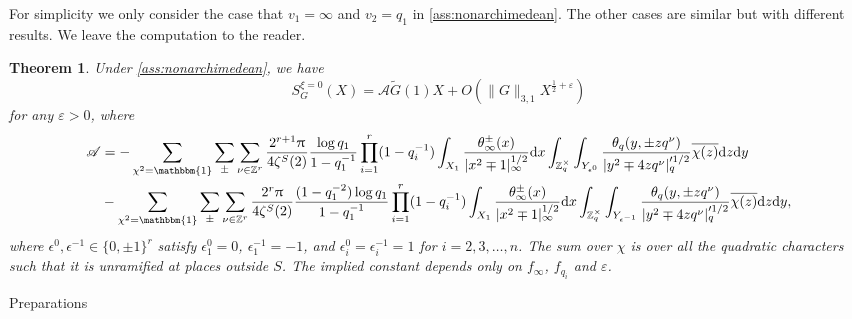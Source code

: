 \documentclass[10pt,oneside,reqno]{amsart}
\makeatletter
\newcommand\rmd{\mathrm{d}}
\newcommand\ZZ{\mathbb{Z}}
\newcommand\ms[1]{\mathscr{#1}}
\newcommand\triv{\mathbbm{1}}
\def\subsection{\@startsection{subsection}{2}%
  \z@{3pt\@plus0pt}{-.5em}%
  {\normalfont\bfseries}}
\theoremstyle{THEOREM}
\newtheorem{theorem}{Theorem}[section]
\theoremstyle{DEFINITION}
\theoremstyle{EXERCISE}
\numberwithin{equation}{section}
\makeatother
\begin{document}
For simplicity we only consider the case that $v_1=\infty$ and $v_2=q_1$ in \autoref{ass:nonarchimedean}. The other cases are similar but with different results. We leave the computation to the reader.
\begin{theorem}\label{thm:contributionxi0}
Under \autoref{ass:nonarchimedean}, we have
\[
S_G^{\xi=0}(X)=\ms{A}\widetilde{G}(1) X+O(\|G\|_{3,1}X^{\frac12+\varepsilon})
\]
for any $\varepsilon>0$,
where
\begin{align*}
\ms{A}&=-\sum_{\chi^2=\triv}\sum_{\pm}\sum_{\nu\in \ZZ^r}\frac{2^{r+1}\uppi}{4\zeta^S(2)}\frac{\log q_1}{1-q_1^{-1}}\prod_{i=1}^{r}(1-q_i^{-1})\int_{X_1}\frac{\theta_\infty^\pm(x)}{|x^2\mp 1|_\infty^{1/2}}\rmd x \int_{\ZZ_{q}^\times}\int_{Y_{\epsilon^0}} \frac{\theta_{q}(y,\pm zq^\nu)}{|y^2\mp 4zq^\nu|_q'^{1/2}}\overline{\chi(z)}\rmd z\rmd y \\
&-\sum_{\chi^2=\triv}\sum_{\pm}\sum_{\nu\in \ZZ^r}\frac{2^{r}\uppi}{4\zeta^S(2)}\frac{(1-q_1^{-2})\log q_1}{1-q_1^{-1}}\prod_{i=1}^{r}(1-q_i^{-1})\int_{X_1}\frac{\theta_\infty^\pm(x)}{|x^2\mp 1|_\infty^{1/2}}\rmd x \int_{\ZZ_{q}^\times}\int_{Y_{\epsilon^{-1}}} \frac{\theta_{q}(y,\pm zq^\nu)}{|y^2\mp 4zq^\nu|_q'^{1/2}}\overline{\chi(z)}\rmd z\rmd y,
\end{align*}
where $\epsilon^0, \epsilon^{-1}\in \{0,\pm 1\}^r$ satisfy $\epsilon^{0}_1=0$, $\epsilon_1^{-1}=-1$, and $\epsilon_i^0=\epsilon_i^{-1}=1$ for $i=2,3,\dots,n$. The sum over $\chi$ is over all the quadratic characters such that it is unramified at places outside $S$. The implied constant depends only on $f_\infty$, $f_{q_i}$ and $\varepsilon$.
\end{theorem}

\subsection{Preparations}
\end{document}
